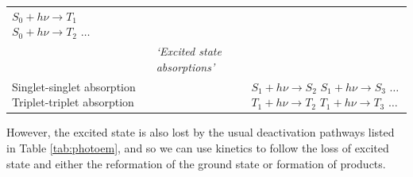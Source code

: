\documentclass[
]{book}
\begin{document}
\begin{longtable}[]{@{}lll@{}}
\begin{minipage}[t]{0.23\columnwidth}
\(S_0 + h \nu \longrightarrow T_1\) \(S_0 + h \nu \longrightarrow T_2\) \(\dots\)\strut
\end{minipage}\tabularnewline
\begin{minipage}[t]{0.35\columnwidth}\raggedright
\strut
\end{minipage} & \begin{minipage}[t]{0.33\columnwidth}\raggedright
\emph{`Excited state absorptions'}\strut
\end{minipage} & \begin{minipage}[t]{0.23\columnwidth}\raggedright
\strut
\end{minipage}\tabularnewline
\begin{minipage}[t]{0.35\columnwidth}\raggedright
Singlet-singlet absorption Triplet-triplet absorption\strut
\end{minipage} & \begin{minipage}[t]{0.33\columnwidth}\raggedright
\strut
\end{minipage} & \begin{minipage}[t]{0.23\columnwidth}\raggedright
\(S_1 + h \nu \longrightarrow S_2\) \(S_1 + h \nu \longrightarrow S_3\) \(\dots\)\(T_1 + h \nu \longrightarrow T_2\) \(T_1 + h \nu \longrightarrow T_3\) \(\dots\)\strut
\end{minipage}\tabularnewline
\bottomrule
\end{longtable}

However, the excited state is also lost by the usual deactivation pathways listed in Table \ref{tab:photoem}, and so we can use kinetics to follow the loss of excited state and either the reformation of the ground state or formation of products.
\end{document}
